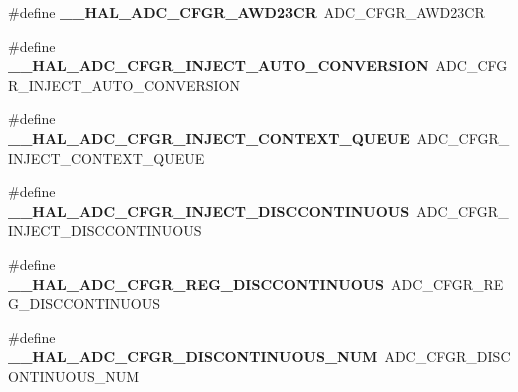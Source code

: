 \begin{DoxyCompactItemize}
\item 
\#define {\bfseries \+\_\+\+\_\+\+H\+A\+L\+\_\+\+A\+D\+C\+\_\+\+C\+F\+G\+R\+\_\+\+A\+W\+D23\+CR}~A\+D\+C\+\_\+\+C\+F\+G\+R\+\_\+\+A\+W\+D23\+CR\hypertarget{group___h_a_l___a_d_c___aliased___macros_ga73200fff4fe5aa62989ea33522fa3cfc}{}\label{group___h_a_l___a_d_c___aliased___macros_ga73200fff4fe5aa62989ea33522fa3cfc}

\item 
\#define {\bfseries \+\_\+\+\_\+\+H\+A\+L\+\_\+\+A\+D\+C\+\_\+\+C\+F\+G\+R\+\_\+\+I\+N\+J\+E\+C\+T\+\_\+\+A\+U\+T\+O\+\_\+\+C\+O\+N\+V\+E\+R\+S\+I\+ON}~A\+D\+C\+\_\+\+C\+F\+G\+R\+\_\+\+I\+N\+J\+E\+C\+T\+\_\+\+A\+U\+T\+O\+\_\+\+C\+O\+N\+V\+E\+R\+S\+I\+ON\hypertarget{group___h_a_l___a_d_c___aliased___macros_ga16b4ff7c58c0fe8141bd8bf6adf0f27c}{}\label{group___h_a_l___a_d_c___aliased___macros_ga16b4ff7c58c0fe8141bd8bf6adf0f27c}

\item 
\#define {\bfseries \+\_\+\+\_\+\+H\+A\+L\+\_\+\+A\+D\+C\+\_\+\+C\+F\+G\+R\+\_\+\+I\+N\+J\+E\+C\+T\+\_\+\+C\+O\+N\+T\+E\+X\+T\+\_\+\+Q\+U\+E\+UE}~A\+D\+C\+\_\+\+C\+F\+G\+R\+\_\+\+I\+N\+J\+E\+C\+T\+\_\+\+C\+O\+N\+T\+E\+X\+T\+\_\+\+Q\+U\+E\+UE\hypertarget{group___h_a_l___a_d_c___aliased___macros_ga5010d7820f890534d6b6005438038ef5}{}\label{group___h_a_l___a_d_c___aliased___macros_ga5010d7820f890534d6b6005438038ef5}

\item 
\#define {\bfseries \+\_\+\+\_\+\+H\+A\+L\+\_\+\+A\+D\+C\+\_\+\+C\+F\+G\+R\+\_\+\+I\+N\+J\+E\+C\+T\+\_\+\+D\+I\+S\+C\+C\+O\+N\+T\+I\+N\+U\+O\+US}~A\+D\+C\+\_\+\+C\+F\+G\+R\+\_\+\+I\+N\+J\+E\+C\+T\+\_\+\+D\+I\+S\+C\+C\+O\+N\+T\+I\+N\+U\+O\+US\hypertarget{group___h_a_l___a_d_c___aliased___macros_gaeaa692ac73b859de118c28bc0327cf77}{}\label{group___h_a_l___a_d_c___aliased___macros_gaeaa692ac73b859de118c28bc0327cf77}

\item 
\#define {\bfseries \+\_\+\+\_\+\+H\+A\+L\+\_\+\+A\+D\+C\+\_\+\+C\+F\+G\+R\+\_\+\+R\+E\+G\+\_\+\+D\+I\+S\+C\+C\+O\+N\+T\+I\+N\+U\+O\+US}~A\+D\+C\+\_\+\+C\+F\+G\+R\+\_\+\+R\+E\+G\+\_\+\+D\+I\+S\+C\+C\+O\+N\+T\+I\+N\+U\+O\+US\hypertarget{group___h_a_l___a_d_c___aliased___macros_gad118cacc67e8c3f930008f5aa6d8dade}{}\label{group___h_a_l___a_d_c___aliased___macros_gad118cacc67e8c3f930008f5aa6d8dade}

\item 
\#define {\bfseries \+\_\+\+\_\+\+H\+A\+L\+\_\+\+A\+D\+C\+\_\+\+C\+F\+G\+R\+\_\+\+D\+I\+S\+C\+O\+N\+T\+I\+N\+U\+O\+U\+S\+\_\+\+N\+UM}~A\+D\+C\+\_\+\+C\+F\+G\+R\+\_\+\+D\+I\+S\+C\+O\+N\+T\+I\+N\+U\+O\+U\+S\+\_\+\+N\+UM\hypertarget{group___h_a_l___a_d_c___aliased___macros_ga6c152cf129addeff1a7f296fa89b04af}{}\label{group___h_a_l___a_d_c___aliased___macros_ga6c152cf129addeff1a7f296fa89b04af}


\end{DoxyCompactItemize}
